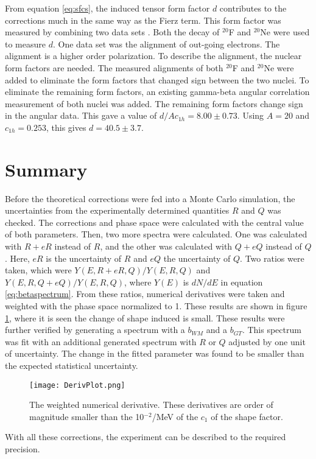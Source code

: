 \documentclass[../MaxHughesThesis.tex]{subfiles}
\begin{document}
From equation \ref{eq:sfcs}, the induced tensor form factor $d$ contributes to the corrections much in the same way as the Fierz term.
This form factor was measured by combining two data sets \cite{Min11}.
Both the decay of $^{20}$F and $^{20}$Ne were used to measure $d$.
One data set was the alignment of out-going electrons.
The alignment is a higher order polarization.
To describe the alignment, the nuclear form factors are needed.  
The measured alignments of both $^{20}$F and $^{20}$Ne were added to eliminate the form factors that changed sign between the two nuclei.
To eliminate the remaining form factors, an existing gamma-beta angular correlation measurement of both nuclei was added. 
The remaining form factors change sign in the angular data.
This gave a value of $d/Ac_{1h} = 8.00 \pm 0.73$.
Using $A = 20$ and $c_{1h} = 0.253$, this gives $d = 40.5 \pm 3.7$. 

\section{Summary}

Before the theoretical corrections were fed into a Monte Carlo simulation, the uncertainties from the experimentally determined quantities $R$ and $Q$ was checked.
The corrections and phase space were calculated with the central value of both parameters.
Then, two more spectra were calculated.
One was calculated with $R + eR$ instead of $R$, and the other was calculated with $Q + eQ$ instead of $Q$.
Here, $eR$ is the uncertainty of $R$ and $eQ$ the uncertainty of $Q$.
Two ratios were taken, which were $Y(E,R+eR,Q)/Y(E,R,Q)$ and $Y(E,R,Q+eQ)/Y(E,R,Q)$, where $Y(E)$ is $dN/dE$ in equation \ref{eq:betaspectrum}.
From these ratios, numerical derivatives were taken and weighted with the phase space normalized to 1.
These results are shown in figure \ref{fig:theoryuncer}, where it is seen the change of shape induced is small.
These results were further verified by generating a spectrum with a $b_{WM}$ and a $b_{GT}$.
This spectrum was fit with an additional generated spectrum with $R$ or $Q$ adjusted by one unit of uncertainty.
The change in the fitted parameter was found to be smaller than the expected statistical uncertainty.

\begin{figure}[!htb]
	\centerline{\texttt{[image: DerivPlot.png]}}
	\caption{The weighted numerical derivative.
		 These derivatives are order of magnitude smaller than the 10$^{-2}$/MeV of the $c_{1}$ of the shape factor.}
	\label{fig:theoryuncer}
\end{figure}
With all these corrections, the experiment can be described to the required precision.
\end{document}

